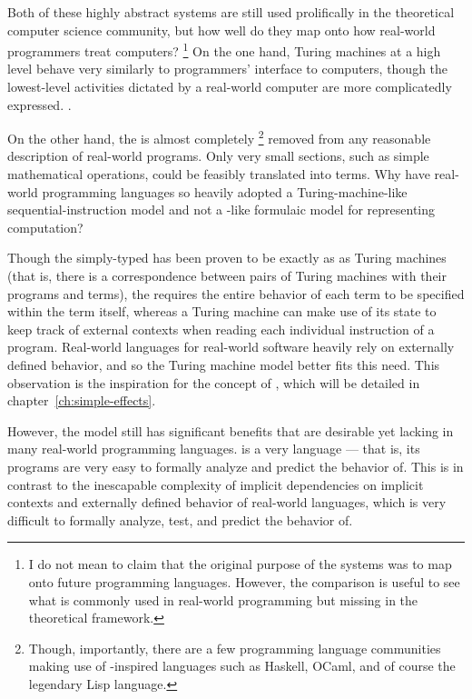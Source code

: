 Both of these highly abstract systems are still used prolifically in the theoretical computer science community, but how well do they map onto how real-world programmers treat computers?%
\footnote{
  I do not mean to claim that the original purpose of the systems was to map onto future programming languages.
  However, the comparison is useful to see what is commonly used in real-world programming but missing in the theoretical framework.
}
On the one hand, Turing machines at a high level behave very similarly to programmers' interface to computers, though the lowest-level activities dictated by a real-world computer are more complicatedly expressed.
\clearpage .

On the other hand, the \lc is almost completely%
\footnote{
  Though, importantly, there are a few programming language communities making use of \lc-inspired languages such as Haskell, OCaml, and of course the legendary Lisp language.
}
removed from any reasonable description of real-world programs.
Only very small sections, such as simple mathematical operations, could be feasibly translated into \lc terms.
Why have real-world programming languages so heavily adopted a Turing-machine-like sequential-instruction model and not a \lc-like formulaic model for representing computation?

Though the simply-typed \lc has been proven to be exactly as  as Turing machines (that is, there is a correspondence between pairs of Turing machines with their programs and \lc terms),
the \lc requires the entire behavior of each term to be specified within the term itself,
whereas a Turing machine can make use of its state to keep track of external contexts when reading each individual instruction of a program.
Real-world languages for real-world software heavily rely on externally defined behavior, and so the Turing machine model better fits this need.
This observation is the inspiration for the concept of , which will be detailed in chapter~\ref{ch:simple-effects}.

However, the \lc model still has significant benefits that are desirable yet lacking in many real-world programming languages.
\lc is a very  language --- that is, its programs are very easy to formally analyze and predict the behavior of.
This is in contrast to the  inescapable complexity of implicit dependencies on implicit contexts and externally defined behavior of real-world languages, which is very difficult to formally analyze, test, and predict the behavior of.

